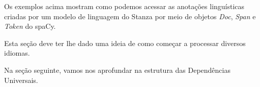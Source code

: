 \documentclass[
  brazilian,
]{article}
\begin{document}
Os exemplos acima mostram como podemos acessar as anotações linguísticas
criadas por um modelo de linguagem do Stanza por meio de objetos
\emph{Doc}, \emph{Span} e \emph{Token} do spaCy.

Esta seção deve ter lhe dado uma ideia de como começar a processar
diversos idiomas.

Na seção seguinte, vamos nos aprofundar na estrutura das Dependências
Universais.
\end{document}
